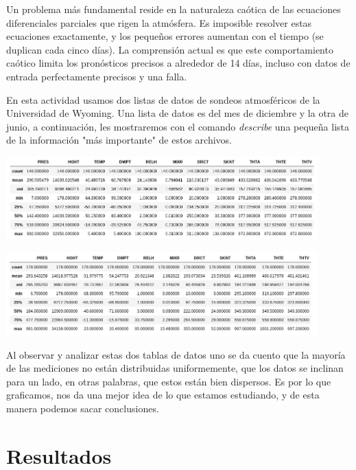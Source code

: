 \documentclass{article}
\begin{document}
Un problema más fundamental reside en la naturaleza caótica de las ecuaciones diferenciales parciales que rigen la atmósfera. Es imposible resolver estas ecuaciones exactamente, y los pequeños errores aumentan con el tiempo (se duplican cada cinco días). La comprensión actual es que este comportamiento caótico limita los pronósticos precisos a alrededor de 14 días, incluso con datos de entrada perfectamente precisos y una falla.

\vspace{0.3cm}

En esta actividad usamos dos listas de datos de sondeos atmosféricos de la Universidad de Wyoming. Una lista de datos es del mes de diciembre y la otra de junio, a continuación, les mostraremos con el comando \textit{describe} una pequeña lista de la información "más importante" de estos archivos.

\begin{center}
	\includegraphics[width=12cm]{describeD.png}
\end{center}

\begin{center}
	\includegraphics[width=12cm]{describeJ.png}
\end{center}

\vspace{0.3cm}

Al observar y analizar estas dos tablas de datos uno se da cuento que la mayoría de las mediciones no están distribuidas uniformemente, que los datos se inclinan para un lado, en otras palabras, que estos están bien dispersos. Es por lo que graficamos, nos da una mejor idea de lo que estamos estudiando, y de esta manera podemos sacar conclusiones.

\section{Resultados}
\end{document}
